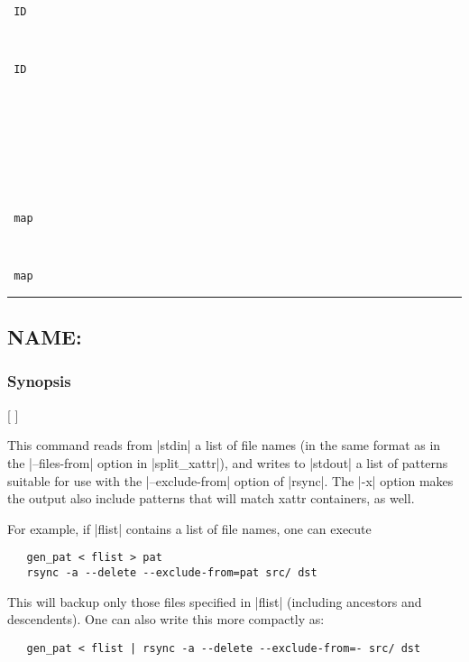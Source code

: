 \documentclass[11pt]{article}
\def\sepline{\begin{center}\rule{5in}{1pt}\end{center}}
\newcommand\BackSlash{\char92}
\newcommand\LeftBrace{\char123}
\newcommand\RightBrace{\char125}
\newenvironment{Quote}{\let\\\BackSlash\let\{\LeftBrace\let\}\RightBrace}{}
\begin{document}
\begin{description}
\item[{\tt{}}] \ \\[-3ex]
\item[{\tt{} ID}] \ \\[-3ex]
\item[{\tt{} ID}] \ \\[-3ex]
\item[{\tt {}}] \ \\[-3ex]
\item[{\tt {}}] \ \\[-3ex]
\item[{\tt {}}] \ \\[-3ex]
\item[{\tt {} map}] \ \\[-3ex]
\item[{\tt {} map}] 
\end{description}

\sepline


\subsection*{NAME: \tt{}}

\subsubsection*{Synopsis}

\begin{Quote}
\begin{Vrb}
    [  ]
\end{Vrb}
\end{Quote}

This command reads from |stdin| a list of file names
(in the same format as in the |--files-from| option
in |split_xattr|), and writes to |stdout| a
list of patterns suitable for use with the |--exclude-from|
option of |rsync|.
The |-x| option makes the output also include patterns
that will match xattr containers, as well.

For example, if |flist| contains a list of file names,
one can execute 
\begin{Verbatim}
   gen_pat < flist > pat
   rsync -a --delete --exclude-from=pat src/ dst
\end{Verbatim}
This will backup only those files specified in |flist|
(including ancestors and descendents).
One can also write this more compactly as:
\begin{Verbatim}
   gen_pat < flist | rsync -a --delete --exclude-from=- src/ dst
\end{Verbatim}
\end{document}
